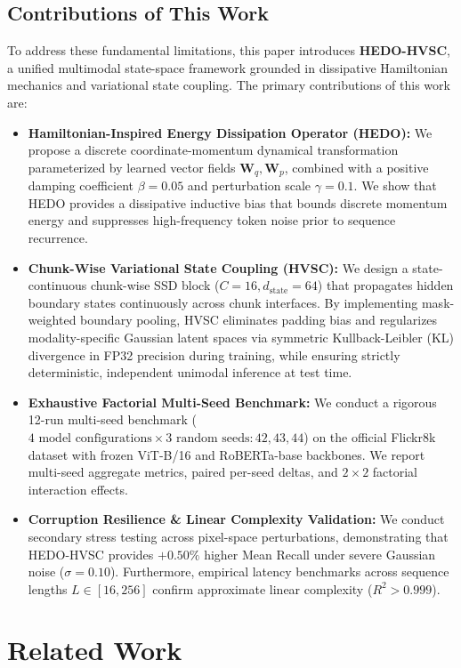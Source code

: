 \documentclass[11pt,journal,onecolumn,draftcls]{IEEEtran}
\begin{document}
\subsection{Contributions of This Work}
To address these fundamental limitations, this paper introduces \textbf{HEDO-HVSC}, a unified multimodal state-space framework grounded in dissipative Hamiltonian mechanics and variational state coupling. The primary contributions of this work are:
\begin{itemize}
    \item \textbf{Hamiltonian-Inspired Energy Dissipation Operator (HEDO):} We propose a discrete coordinate-momentum dynamical transformation parameterized by learned vector fields $\mathbf{W}_q, \mathbf{W}_p$, combined with a positive damping coefficient $\beta=0.05$ and perturbation scale $\gamma=0.1$. We show that HEDO provides a dissipative inductive bias that bounds discrete momentum energy and suppresses high-frequency token noise prior to sequence recurrence.
    \item \textbf{Chunk-Wise Variational State Coupling (HVSC):} We design a state-continuous chunk-wise SSD block ($C=16, d_{\text{state}}=64$) that propagates hidden boundary states continuously across chunk interfaces. By implementing mask-weighted boundary pooling, HVSC eliminates padding bias and regularizes modality-specific Gaussian latent spaces via symmetric Kullback-Leibler (KL) divergence in FP32 precision during training, while ensuring strictly deterministic, independent unimodal inference at test time.
    \item \textbf{Exhaustive Factorial Multi-Seed Benchmark:} We conduct a rigorous 12-run multi-seed benchmark ($4\text{ model configurations} \times 3\text{ random seeds}: 42, 43, 44$) on the official Flickr8k dataset with frozen ViT-B/16 and RoBERTa-base backbones. We report multi-seed aggregate metrics, paired per-seed deltas, and $2\times 2$ factorial interaction effects.
    \item \textbf{Corruption Resilience \& Linear Complexity Validation:} We conduct secondary stress testing across pixel-space perturbations, demonstrating that HEDO-HVSC provides $+0.50\%$ higher Mean Recall under severe Gaussian noise ($\sigma=0.10$). Furthermore, empirical latency benchmarks across sequence lengths $L \in [16, 256]$ confirm approximate linear complexity ($R^2 > 0.999$).
\end{itemize}

\section{Related Work}
\label{sec:related_work}
\end{document}
